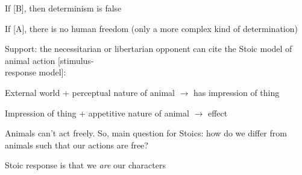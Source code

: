 \documentclass[11pt]{article}
\begin{document}
\noindent If [B], then determinism is false
\vspace*{1mm}

\noindent If [A], there is no human freedom (only a more complex kind of determination)
\vspace*{1mm}

Support: the necessitarian or libertarian opponent can cite the Stoic model of animal action [stimulus-\\\hspace*{6mm}response model]:
\vspace*{1mm}

External world + perceptual nature of animal $\rightarrow$ has impression of thing
\vspace*{1mm}

Impression of thing + appetitive nature of animal $\rightarrow$ effect 
\vspace*{1mm}

\noindent Animals can't act freely. So, main question for Stoics: how do  we differ from animals such that our actions are free?
\vspace*{2mm}

\noindent Stoic response is that we \emph{are} our characters
\end{document}
